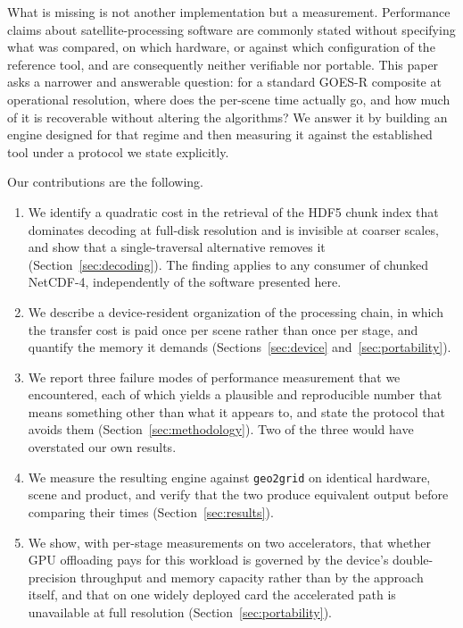 \documentclass[11pt]{article}
\begin{document}
What is missing is not another implementation but a measurement. Performance
claims about satellite-processing software are commonly stated without
specifying what was compared, on which hardware, or against which
configuration of the reference tool, and are consequently neither verifiable
nor portable. This paper asks a narrower and answerable question: for a
standard GOES-R composite at operational resolution, where does the per-scene
time actually go, and how much of it is recoverable without altering the
algorithms? We answer it by building an engine designed for that regime and
then measuring it against the established tool under a protocol we state
explicitly.

Our contributions are the following.

\begin{enumerate}
\item We identify a quadratic cost in the retrieval of the HDF5 chunk index
that dominates decoding at full-disk resolution and is invisible at coarser
scales, and show that a single-traversal alternative removes it
(Section~\ref{sec:decoding}). The finding applies to any consumer of chunked
NetCDF-4, independently of the software presented here.

\item We describe a device-resident organization of the processing chain, in
which the transfer cost is paid once per scene rather than once per stage, and
quantify the memory it demands (Sections~\ref{sec:device}
and~\ref{sec:portability}).

\item We report three failure modes of performance measurement that we
encountered, each of which yields a plausible and reproducible number that
means something other than what it appears to, and state the protocol that
avoids them (Section~\ref{sec:methodology}). Two of the three would have
overstated our own results.

\item We measure the resulting engine against \texttt{geo2grid} on identical
hardware, scene and product, and verify that the two produce equivalent output
before comparing their times (Section~\ref{sec:results}).

\item We show, with per-stage measurements on two accelerators, that whether
GPU offloading pays for this workload is governed by the device's
double-precision throughput and memory capacity rather than by the approach
itself, and that on one widely deployed card the accelerated path is
unavailable at full resolution (Section~\ref{sec:portability}).
\end{enumerate}
\end{document}

